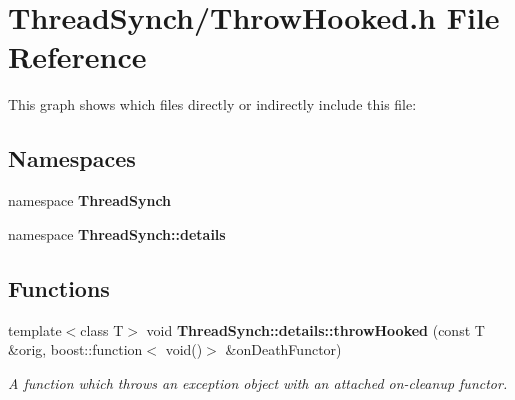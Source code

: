 \section{Thread\-Synch/Throw\-Hooked.h File Reference}
\label{_throw_hooked_8h}


This graph shows which files directly or indirectly include this file:\subsection*{Namespaces}
\begin{CompactItemize}
\item 
namespace {\bf Thread\-Synch}
\item 
namespace {\bf Thread\-Synch::details}
\end{CompactItemize}
\subsection*{Functions}
\begin{CompactItemize}
\item 
template$<$class T$>$ void {\bf Thread\-Synch::details::throw\-Hooked} (const T \&orig, boost::function$<$ void()$>$ \&on\-Death\-Functor)
\begin{CompactList}\small\item\em A function which throws an exception object with an attached on-cleanup functor. \item\end{CompactList}\end{CompactItemize}
